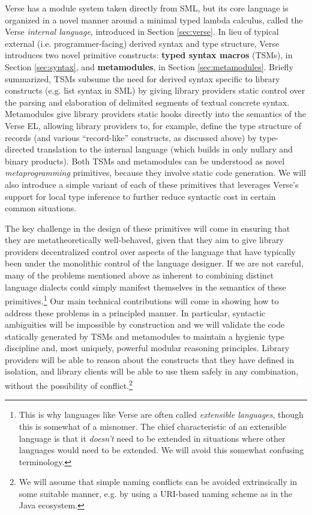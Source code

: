 Verse has a module system taken directly from SML, but its core language is organized in a novel manner around a minimal typed lambda calculus, called the Verse \emph{internal language}, introduced in Section \ref{sec:verse}. In lieu of typical {external} (i.e. programmer-facing) derived syntax and  type structure, Verse introduces two novel primitive constructs: \textbf{typed syntax macros} (TSMs),  in Section \ref{sec:syntax}, and \textbf{metamodules},  in Section \ref{sec:metamodules}. Briefly summarized, TSMs subsume the need for derived syntax specific to library constructs (e.g. list syntax in SML) by giving library providers static control over the parsing and elaboration of delimited segments of textual concrete syntax. Metamodules give library providers static hooks directly into the semantics of the Verse EL, allowing  library providers to, for example, define the type structure of records (and various ``record-like'' constructs, as discussed above) by type-directed translation to the internal language (which builds in only nullary and binary products). Both TSMs and metamodules can be understood as novel \emph{metaprogramming} primitives, because they involve static code generation. We will  also introduce a simple variant of each of these primitives that leverages Verse's support for local type inference to further reduce syntactic cost in certain common situations. 

The key challenge in the design of these primitives will come in ensuring that they are metatheoretically well-behaved, given that they aim to give library providers decentralized control over aspects of the language that have typically been under the monolithic control of the language designer. If we are not careful, many of the problems mentioned above as inherent to combining distinct language dialects could simply manifest themselves in the semantics of these primitives.\footnote{This is why languages  like Verse are often called \emph{extensible languages}, though this is somewhat of a misnomer. The chief characteristic of an extensible language is that it \emph{doesn't} need to be extended in situations where other languages would need to be extended. We will avoid this somewhat confusing terminology.} Our main technical contributions will come in showing how to address these problems in a principled manner. In particular, syntactic ambiguities will be impossible by construction and  we will validate the code  statically generated by TSMs and metamodules to maintain a hygienic type discipline and, most uniquely, powerful modular reasoning principles. Library providers will be able to reason about the constructs that they have defined in isolation, and library clients will be able to use them safely in any combination, without the possibility of conflict.\footnote{We will assume that simple naming conflicts can be avoided extrinsically in some suitable manner, e.g. by using a URI-based naming scheme as in the Java ecosystem.}




